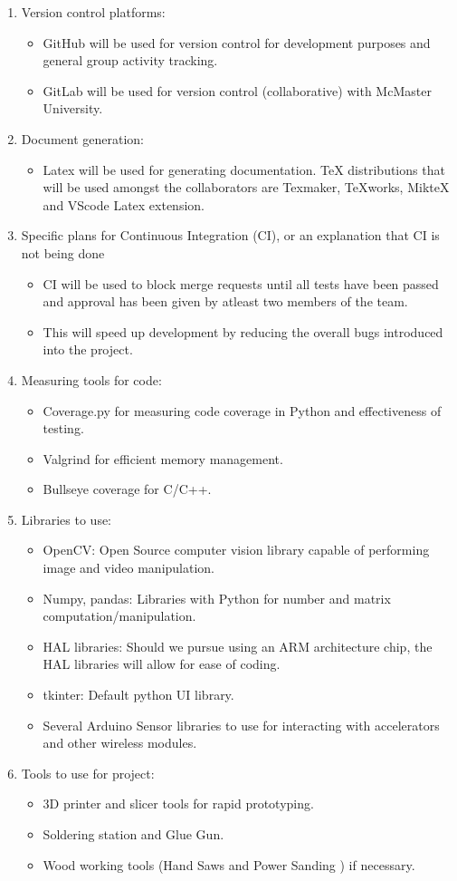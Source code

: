 \documentclass{article}
\begin{document}
\begin{enumerate}
\item Version control platforms:
\begin{itemize}
\item GitHub will be used for version control for development purposes and general group activity tracking.
\item GitLab will be used for version control (collaborative) with McMaster University.
\end{itemize}
\item Document generation:
\begin{itemize}
\item Latex will be used for generating documentation. TeX distributions that will be used amongst the collaborators are  Texmaker, TeXworks, MikteX and VScode Latex extension.
\end{itemize}
\item Specific plans for Continuous Integration (CI), or an explanation that CI
  is not being done
\begin{itemize}
\item CI will be used to block merge requests until all tests have been passed and approval has been given by atleast two members of the team. 
\item This will speed up development by reducing the overall bugs introduced into the project.
\end{itemize}
\item Measuring tools for code:
\begin{itemize}
\item Coverage.py for measuring code coverage in Python and effectiveness of testing.
\item Valgrind for efficient memory management.
\item Bullseye coverage for C/C++.
\end{itemize}
\item Libraries to use:
\begin{itemize}
\item OpenCV: Open Source computer vision library capable of performing image and video manipulation.
\item Numpy, pandas: Libraries with Python for number and matrix computation/manipulation.
\item HAL libraries: Should we pursue using an ARM architecture chip, the HAL libraries will allow for ease of coding.
\item tkinter: Default python UI library.
\item Several Arduino Sensor libraries to use for interacting with accelerators and other wireless modules.
\end{itemize}
\item Tools to use for project:
\begin{itemize}
\item 3D printer and slicer tools for rapid prototyping.
\item Soldering station and Glue Gun.
\item Wood working tools (Hand Saws and Power Sanding ) if necessary.
\end{itemize}
\end{enumerate}
\end{document}
